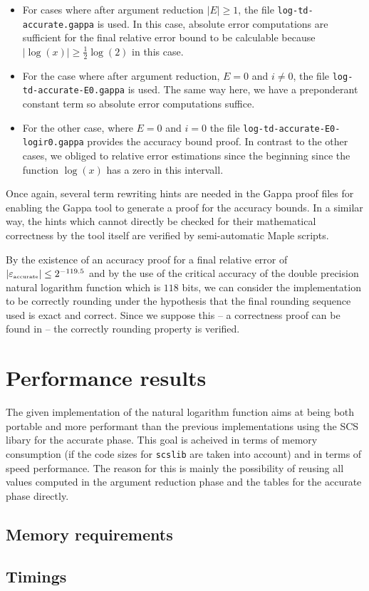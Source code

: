 \begin{itemize}
\item For cases where after argument reduction $\left \vert E \right \vert \geq 1$, 
the file {\tt log-td-accurate.gappa} is used. In this case, absolute error computations are sufficient 
for the final relative error bound to be calculable because 
$\left \vert \log\left( x \right) \right \vert \geq \frac{1}{2} \log\left( 2 \right)$ in this case.
\item For the case where after argument reduction, $E = 0$ and $i \not = 0$, the file 
{\tt log-td-accurate-E0.gappa} is used. The same way here, we have a preponderant constant term so absolute
error computations suffice.
\item For the other case, where $E=0$ and $i=0$ the file {\tt log-td-accurate-E0-logir0.gappa} provides the 
accuracy bound proof. In contrast to the other cases, we obliged to relative error estimations since the beginning
since the function $\log\left( x \right)$ has a zero in this intervall.
\end{itemize}
Once again, several term rewriting hints are needed in the Gappa proof files for enabling the Gappa tool to 
generate a proof for the accuracy bounds. In a similar way, the hints which cannot directly be checked for their 
mathematical correctness by the tool itself are verified by semi-automatic Maple scripts.\par
By the existence of an accuracy proof for a final relative error of $\left \vert \epsilon_{\mbox{\tiny accurate}} \right \vert \leq 2^{-119.5}$ and
by the use of the critical accuracy of the double precision natural logarithm function which is 
$118$ bits\cite{DinDefLau2004LIP}, we can consider the implementation to be correctly rounding under the hypothesis
that the final rounding sequence used is exact and correct. Since we suppose this -- a correctness proof can be 
found in \cite{Lau05} -- the correctly rounding property is verified.
\section{Performance results}
The given implementation of the natural logarithm function aims at
being both portable and more performant than the previous
implementations using the SCS libary for the accurate phase.  This
goal is acheived in terms of memory consumption (if the code sizes for
{\tt scslib} are taken into account) and in terms of speed
performance. The reason for this is mainly the possibility of reusing
all values computed in the argument reduction phase and the tables for
the accurate phase directly.

\subsection{Memory requirements}



\subsection{Timings}